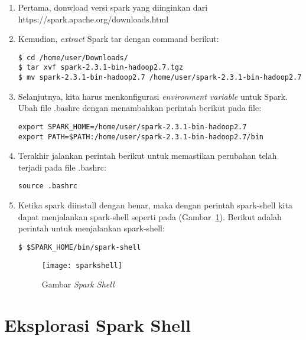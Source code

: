 \begin{enumerate}

\item Pertama, donwload versi spark yang diinginkan  dari https://spark.apache.org/downloads.html

\item Kemudian, \textit{extract} Spark tar dengan command berikut:

\begin{verbatim}
$ cd /home/user/Downloads/ 
$ tar xvf spark-2.3.1-bin-hadoop2.7.tgz 
$ mv spark-2.3.1-bin-hadoop2.7 /home/user/spark-2.3.1-bin-hadoop2.7 
\end{verbatim}

\item Selanjutnya, kita harus menkonfigurasi \textit{environment variable} untuk Spark. Ubah file .bashrc dengan menambahkan perintah berikut pada file:

\begin{verbatim}
export SPARK_HOME=/home/user/spark-2.3.1-bin-hadoop2.7
export PATH=$PATH:/home/user/spark-2.3.1-bin-hadoop2.7/bin
\end{verbatim}

\item Terakhir jalankan perintah berikut untuk memastikan perubahan telah terjadi pada file .bashrc:

\begin{verbatim}
source .bashrc
\end{verbatim}

\item Ketika spark diinstall dengan benar, maka dengan perintah spark-shell kita dapat menjalankan spark-shell seperti pada (Gambar~\ref{fig:sparkshell}). Berikut adalah perintah untuk menjalankan spark-shell:

\begin{verbatim}
$ $SPARK_HOME/bin/spark-shell
\end{verbatim}

\begin{figure}[H]
    \centering  
    \texttt{[image: sparkshell]}  
    \caption[Gambar {\it Spark Shell} ]{Gambar {\it Spark Shell}} 
    \label{fig:sparkshell} 
\end{figure}

\end{enumerate}


\section{Eksplorasi Spark Shell}


